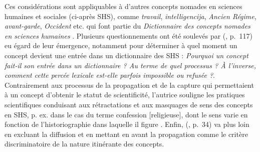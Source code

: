 \begin{description}
Ces considérations sont appliquables à d'autres \og{}concepts nomades\fg{} en sciences humaines et sociales (ci-après \textsc{SHS}), comme \textit{travail}, \textit{intelligencija}, \textit{Ancien Régime}, \textit{avant-garde}, \textit{Occident} etc. qui font partie du \textit{Dictionnaire des concepts nomades en sciences humaines} \citep{christin2011dictionnaire}. Plusieurs questionnements ont été soulevés par \citeauthor{ghermani2011} (\citeyear{ghermani2011}, p.~117) eu égard de leur émergence, notamment pour déterminer à quel moment un concept devient une entrée dans un dictionnaire des \textsc{SHS} : \og{}\textit{Pourquoi un concept fait-il son entrée dans un dictionnaire ? Au terme de quel processus ? À l'inverse, comment cette percée lexicale est-elle parfois impossible ou refusée ?}\fg{}. Contrairement aux processus de la propagation et de la capture qui permettaient à un concept d'obtenir le statut de scientificité,
l'autrice souligne les pratiques scientifiques conduisant aux rétractations et aux masquages de sens des concepts en \textsc{SHS}, p. ex. dans le cas du terme \og{}confession [religieuse]\fg{}, dont le sens varie en fonction de l'historiographie dans laquelle il figure \citep[p.~117]{ghermani2011}. Enfin, \citeauthor{bal2002travelling} (\citeyear{bal2002travelling}, p.~34) va plus loin en excluant la \og diffusion \fg{} et en mettant en avant la \og propagation \fg{} comme le critère discriminatoire de la nature itinérante des concepts. 


\end{description}
